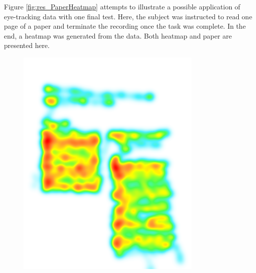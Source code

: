 Figure \ref{fig:res_PaperHeatmap} attempts to illustrate a possible application of eye-tracking data with one final test. Here, the subject was instructed to read one page of a paper and terminate the recording once the task was complete. In the end, a heatmap was generated from the data. Both heatmap and paper are presented here. 

\begin{figure}
    \centering
    \begin{minipage}{0.5\textwidth}
        \centering
        \includegraphics[width=0.8\textwidth]{Images/DataQuality/PaperHeatmap.png}
    \end{minipage}\hfill
    \begin{minipage}{0.5\textwidth}
        \centering

\end{minipage}
\end{figure}
